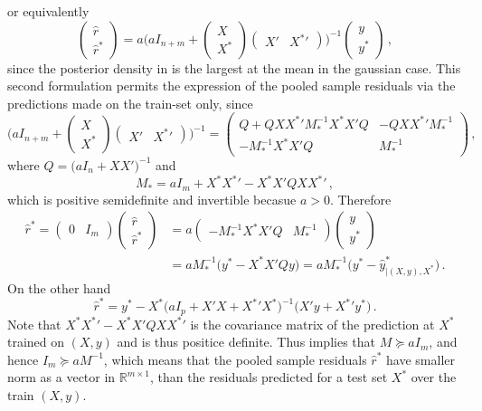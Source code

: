 \documentclass[a4paper,14pt]{article}
\newcommand{\Real}{\mathbb{R}}
\begin{document}
or equivalently
$$ \begin{pmatrix} \hat{r} \\ \hat{r}^* \end{pmatrix}
  = a \Biggl(
      a I_{n+m}
      + \begin{pmatrix} X \\ X^* \end{pmatrix} \begin{pmatrix} X' & {X^*}' \end{pmatrix} 
    \Biggr)^{-1}
  \begin{pmatrix} y \\ y^* \end{pmatrix}
  \,, $$
since the posterior density in is the largest at the mean in the gaussian case.
This second formulation permits the expression of the pooled sample residuals via
the predictions made on the train-set only, since
$$ \Biggl(
      a I_{n+m}
      + \begin{pmatrix} X \\ X^* \end{pmatrix}
        \begin{pmatrix} X' & {X^*}' \end{pmatrix} 
  \Biggr)^{-1}
  = \begin{pmatrix}
    Q + Q X {X^*}' M_*^{-1} X^* X' Q & - Q X {X^*}' M_*^{-1} \\
    - M_*^{-1} X^* X' Q & M_*^{-1}
  \end{pmatrix}
\,, $$
where $Q = \bigl(a I_n + X X'\bigr)^{-1}$ and
$$ M_* = a I_m + X^* {X^*}' - X^* X' Q X {X^*}' \,, $$
which is positive semidefinite and invertible becasue $a>0$. Therefore
\begin{align*}
\hat{r}^*
  = \begin{pmatrix} 0 & I_m \end{pmatrix}
    \begin{pmatrix} \hat{r} \\ \hat{r}^* \end{pmatrix}
  &= a \begin{pmatrix} - M_*^{-1} X^* X' Q & M_*^{-1} \end{pmatrix}
  \begin{pmatrix} y \\ y^* \end{pmatrix} \\
  &= a M_*^{-1} \bigl( y^* - X^* X' Q y \bigr)
  = a M_*^{-1} \bigl( y^* - \hat{y}^*_{|(X, y), X^*} \bigr) \,.
\end{align*}
On the other hand
$$ \hat{r}^*
  = y^* - X^*\bigl(
      a I_p + X'X + {X^*}'X^*
    \bigr)^{-1} \bigl( X'y + {X^*}'y^* \bigr)
  \,. $$
Note that $X^* {X^*}' - X^* X' Q X {X^*}'$ is the covariance matrix of the prediction at $X^*$
trained on $(X, y)$ and is thus positice definite. Thus implies that $M \succeq a I_m$, and
hence $I_m \succeq a M^{-1}$, which means that the pooled sample residuals $\hat{r}^*$
have smaller norm as a vector in $\Real^{m\times 1}$, than the residuals predicted for a test
set $X^*$ over the train $(X, y)$.
\end{document}
